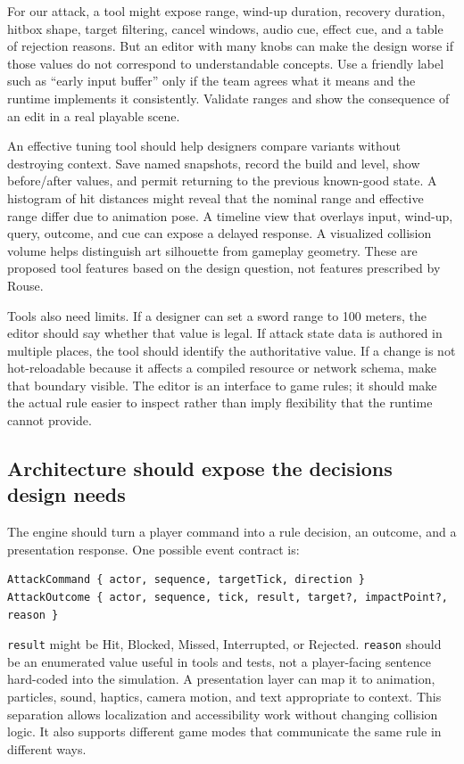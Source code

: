 For our attack, a tool might expose range, wind-up duration, recovery duration, hitbox shape, target filtering, cancel windows, audio cue, effect cue, and a table of rejection reasons. But an editor with many knobs can make the design worse if those values do not correspond to understandable concepts. Use a friendly label such as ``early input buffer'' only if the team agrees what it means and the runtime implements it consistently. Validate ranges and show the consequence of an edit in a real playable scene.

An effective tuning tool should help designers compare variants without destroying context. Save named snapshots, record the build and level, show before/after values, and permit returning to the previous known-good state. A histogram of hit distances might reveal that the nominal range and effective range differ due to animation pose. A timeline view that overlays input, wind-up, query, outcome, and cue can expose a delayed response. A visualized collision volume helps distinguish art silhouette from gameplay geometry. These are proposed tool features based on the design question, not features prescribed by Rouse.

Tools also need limits. If a designer can set a sword range to 100 meters, the editor should say whether that value is legal. If attack state data is authored in multiple places, the tool should identify the authoritative value. If a change is not hot-reloadable because it affects a compiled resource or network schema, make that boundary visible. The editor is an interface to game rules; it should make the actual rule easier to inspect rather than imply flexibility that the runtime cannot provide.

\subsection{Architecture should expose the decisions design needs}\label{06-engine-ii-ch032-architecture-should-expose-the-decisions-design-needs}

The engine should turn a player command into a rule decision, an outcome, and a presentation response. One possible event contract is:

\begin{verbatim}
AttackCommand { actor, sequence, targetTick, direction }
AttackOutcome { actor, sequence, tick, result, target?, impactPoint?, reason }
\end{verbatim}

\texttt{result} might be Hit, Blocked, Missed, Interrupted, or Rejected. \texttt{reason} should be an enumerated value useful in tools and tests, not a player-facing sentence hard-coded into the simulation. A presentation layer can map it to animation, particles, sound, haptics, camera motion, and text appropriate to context. This separation allows localization and accessibility work without changing collision logic. It also supports different game modes that communicate the same rule in different ways.

